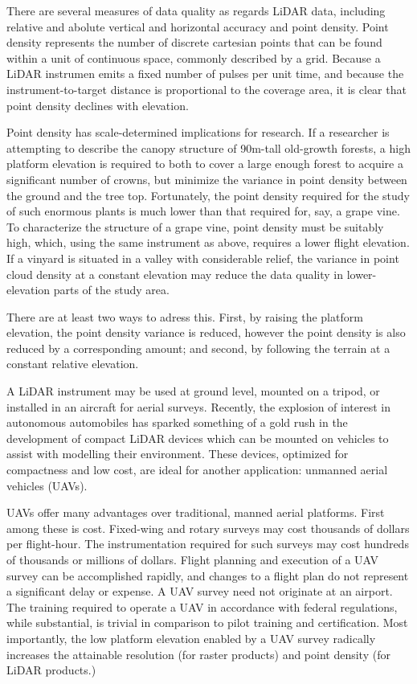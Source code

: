 \documentclass[10pt,a4paper]{report}
\begin{document}
There are several measures of data quality as regards LiDAR data, including relative and abolute vertical and horizontal accuracy and point density. Point density represents the number of discrete cartesian points that can be found within a unit of continuous space, commonly described by a grid. Because a LiDAR instrumen emits a fixed number of pulses per unit time, and because the instrument-to-target distance is proportional to the coverage area, it is clear that point density declines with elevation. 

Point density has scale-determined implications for research. If a researcher is attempting to describe the canopy structure of 90m-tall old-growth forests, a high platform elevation is required to both to cover a large enough forest to acquire a significant number of crowns, but minimize the variance in point density between the ground and the tree top. Fortunately, the point density required for the study of such enormous plants is much lower than that required for, say, a grape vine. To characterize the structure of a grape vine, point density must be suitably high, which, using the same instrument as above, requires a lower flight elevation. If a vinyard is situated in a valley with considerable relief, the variance in point cloud density at a constant elevation may reduce the data quality in lower-elevation  parts of the study area.

There are at least two ways to adress this. First, by raising the platform elevation, the point density variance is reduced, however the point density is also reduced by a corresponding amount; and second, by following the terrain at a constant relative elevation.

A LiDAR instrument may be used at ground level, mounted on a tripod, or installed in an aircraft for aerial surveys. Recently, the explosion of interest in autonomous automobiles has sparked something of a gold rush in the development of compact LiDAR devices which can be mounted on vehicles to assist with modelling their environment. These devices, optimized for compactness and low cost, are ideal for another application: unmanned aerial vehicles (UAVs).

UAVs offer many advantages over traditional, manned aerial platforms. First among these is cost. Fixed-wing and rotary surveys may cost thousands of dollars per flight-hour. The instrumentation required for such surveys may cost hundreds of thousands or millions  of dollars. Flight planning and execution of a UAV survey can be accomplished rapidly, and changes to a flight plan do not represent a significant delay or expense. A UAV survey need not originate at an airport. The training required to operate a UAV in accordance with federal regulations, while substantial, is trivial in comparison to pilot training and certification. Most importantly, the low platform elevation enabled by a UAV survey radically increases the attainable resolution (for raster products) and point density (for LiDAR products.)
\end{document}
